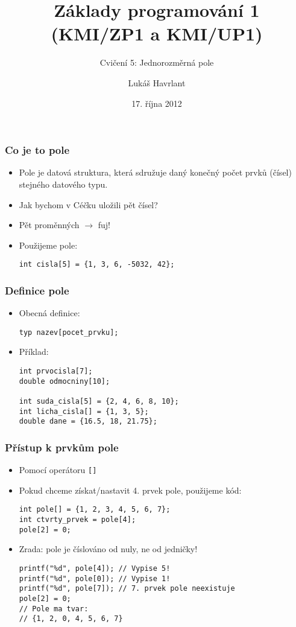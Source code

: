 \documentclass{beamer}
\title{Základy programování 1 (KMI/ZP1 a KMI/UP1)}
\subtitle{Cvičení 5: Jednorozměrná pole}
\author{Lukáš Havrlant}
\date{17. října 2012}
\institute{Univerzita Palackého}
\newenvironment{itemizex}%
  {\large \begin{itemize}%
    \setlength{\itemsep}{8pt}%
    \setlength{\parskip}{8pt}}%
  {\end{itemize}}
\begin{document}
\begin{frame}[t,plain]
\titlepage
\end{frame}


\begin{frame}[t,fragile]\frametitle{Co je to pole} 
  \begin{itemizex}
    \item Pole je datová struktura, která sdružuje daný konečný počet prvků (čísel) stejného datového typu.
    \item Jak bychom v Céčku uložili pět čísel? 
    \item Pět proměnných $\longrightarrow$ fuj!
    \item Použijeme pole: 
\begin{verbatim} 
int cisla[5] = {1, 3, 6, -5032, 42};
\end{verbatim}
  \end{itemizex}
\end{frame}


\begin{frame}[t,fragile]\frametitle{Definice pole} 
  \begin{itemizex}
    \item Obecná definice:
    \begin{verbatim} 
typ nazev[pocet_prvku];
    \end{verbatim}
    \item Příklad:
    \begin{verbatim} 
int prvocisla[7];
double odmocniny[10];

int suda_cisla[5] = {2, 4, 6, 8, 10};
int licha_cisla[] = {1, 3, 5};
double dane = {16.5, 18, 21.75};
    \end{verbatim}
  \end{itemizex}
\end{frame}



\begin{frame}[t,fragile]\frametitle{Přístup k prvkům pole} 
  \begin{itemize}
    \item Pomocí operátoru \texttt{[]}
    \item Pokud chceme získat/nastavit 4. prvek pole, použijeme kód:
    \begin{verbatim} 
int pole[] = {1, 2, 3, 4, 5, 6, 7};
int ctvrty_prvek = pole[4];
pole[2] = 0;
    \end{verbatim}
    \item Zrada: pole je číslováno od nuly, ne od jedničky!
    \begin{verbatim} 
printf("%d", pole[4]); // Vypise 5!
printf("%d", pole[0]); // Vypise 1!
printf("%d", pole[7]); // 7. prvek pole neexistuje
pole[2] = 0;
// Pole ma tvar:
// {1, 2, 0, 4, 5, 6, 7}
    \end{verbatim}
  \end{itemize}
\end{frame}
\end{document}
